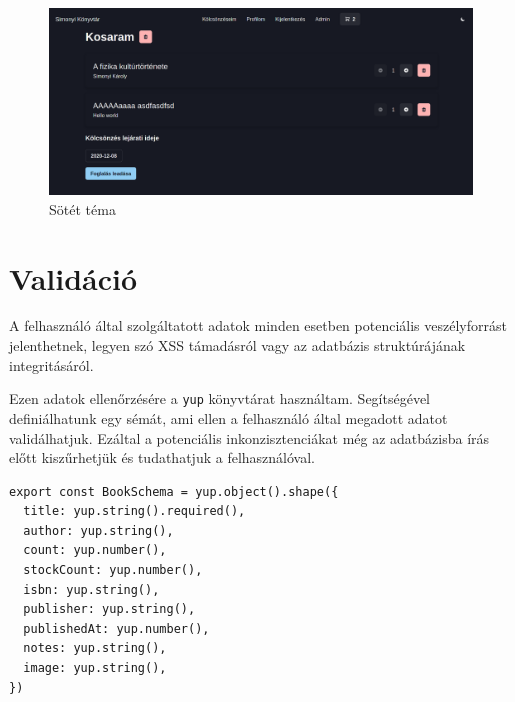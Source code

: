 \begin{figure}[!ht]
  \centering
  \includegraphics[width=150mm, keepaspectratio]{figures/dark-mode.png}
  \caption{Sötét téma}
  \label{fig:DarkMode}
\end{figure}

\section{Validáció}

A felhasználó által szolgáltatott adatok minden esetben potenciális veszélyforrást jelenthetnek, legyen szó XSS támadásról
vagy az adatbázis struktúrájának integritásáról.

Ezen adatok ellenőrzésére a \lstinline|yup| könyvtárat használtam. Segítségével definiálhatunk egy sémát, ami ellen
a felhasználó által megadott adatot validálhatjuk. Ezáltal a potenciális inkonzisztenciákat még az adatbázisba írás előtt
kiszűrhetjük és tudathatjuk a felhasználóval.

\begin{lstlisting}[caption=yup validációs séma a könyvekre]
export const BookSchema = yup.object().shape({
  title: yup.string().required(),
  author: yup.string(),
  count: yup.number(),
  stockCount: yup.number(),
  isbn: yup.string(),
  publisher: yup.string(),
  publishedAt: yup.number(),
  notes: yup.string(),
  image: yup.string(),
})
\end{lstlisting}
